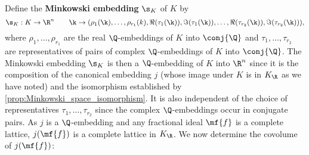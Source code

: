     Define the \textbf{Minkowski embedding} $\s_{K}$ of $K$ by
    \[
      \s_{K}:K \to \R^{n} \qquad \k \to (\rho_{1}(\k),\ldots,\rho_{r_{1}}(k),\Re(\tau_{1}(\k)),\Im(\tau_{1}(\k)),\ldots,\Re(\tau_{r_{2}}(\k)),\Im(\tau_{r_{2}}(\k))),
    \]
    where $\rho_{1},\ldots,\rho_{r_{1}}$ are the real $\Q$-embeddings of $K$ into $\conj{\Q}$ and $\tau_{1},\ldots,\tau_{r_{2}}$ are representatives of pairs of complex $\Q$-embeddings of $K$ into $\conj{\Q}$. The Minkowski embedding $\s_{K}$ is then a $\Q$-embedding of $K$ into $\R^{n}$ since it is the composition of the canonical embedding $j$ (whose image under $K$ is in $K_{\R}$ as we have noted) and the isomorphism established by \cref{prop:Minkowski_space_isomorphism}. It is also independent of the choice of representatives $\tau_{1},\ldots,\tau_{r_{2}}$ since the complex $\Q$-embeddings occur in conjugate pairs. As $j$ is a $\Q$-embedding and any fractional ideal $\mf{f}$ is a complete lattice, $j(\mf{f})$ is a complete lattice in $K_{\R}$. We now determine the covolume of $j(\mf{f})$:

